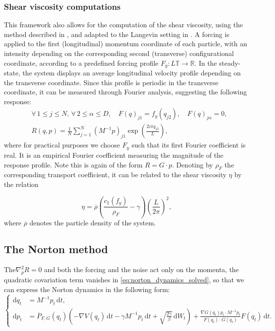 \documentclass[pdflatex,sn-mathphys]{sn-jnl}%
\theoremstyle{thmstyleone}%
\theoremstyle{thmstyletwo}%
\theoremstyle{thmstylethree}%
\renewcommand{\d}{\mathrm{d}}
\newcommand{\1}{\mathbbm{1}}
\begin{document}
\subsubsection{Shear viscosity computations}
This framework also allows for the computation of the shear viscosity, using the method described in \cite{gosling_calculation_1973}, and adapted to the Langevin setting in \cite{joubaud_nonequilibrium_2012}.
A forcing is applied to the first (longitudinal) momentum coordinate of each particle, with an intensity depending on the corresponding second (transverse) configurational coordinate, according to a predefined forcing profile $F_y: L\mathbb T\to \mathbb R$. 
In the steady-state, the system displays an average longitudinal velocity profile depending on the transverse coordinate. Since this profile is periodic in the transverse coordinate, it can be measured through Fourier analysis, suggesting the following response:
\begin{align}
    \label{eq:shear_viscosity_force_flux}
    &\forall\, 1\leq j\leq N,\,\forall\, 2\leq \alpha\leq D,\quad F(q)_{j1}=f_y(q_{j2}),\quad F(q)_{j\alpha}=0,\\
    &R(q,p)=\frac{1}N\sum_{j=1}^N\left(M^{-1}p\right)_{j1}\exp\left(\frac{2i\pi q_{j2}}{L}\right),
\end{align}
where for practical purposes we choose $F_y$ such that its first Fourier coefficient is real.
It is an empirical Fourier coefficient measuring the magnitude of the response profile.
Note this is again of the form $R=G\cdot p$. Denoting by $\rho_F$ the corresponding transport coefficient, it can be related to the shear viscosity $\eta$ by the relation

\begin{equation}
    \label{eq:shear_viscosity}
    \eta = \overline{\rho}\left(\frac{c_1(f_y)}{\rho_F}-\gamma \right)\left(\frac{L}{2\pi}\right)^2,
\end{equation}
where $\overline{\rho}$ denotes the particle density of the system.
\subsection{The Norton method}
The$\nabla^2_p R=0$ and both the forcing and the noise act only on the momenta, the quadratic covariation term vanishes in \eqref{eq:norton_dynamics_solved}, so that we can express the Norton dynamics in the following form:
\begin{equation}
    \label{eq:norton_langevin}
    \left\{
    \begin{aligned}
        \d q_t &= M^{-1}p_t\,\d t,\\
        \d p_t &= \overline{P}_{F,G}(q_t)\left(-\nabla V(q_t)\,\d t -\gamma M^{-1}p_t \,\d t +\sqrt{\frac{2\gamma}{\beta}}\,\d W_t\right) + \frac{\nabla G(q_t)p_t\cdot M^{-1}p_t}{F(q_t)\cdot G(q_t)}F(q_t)\,\d t.
    \end{aligned}
    \right.
\end{equation}
\end{document}
